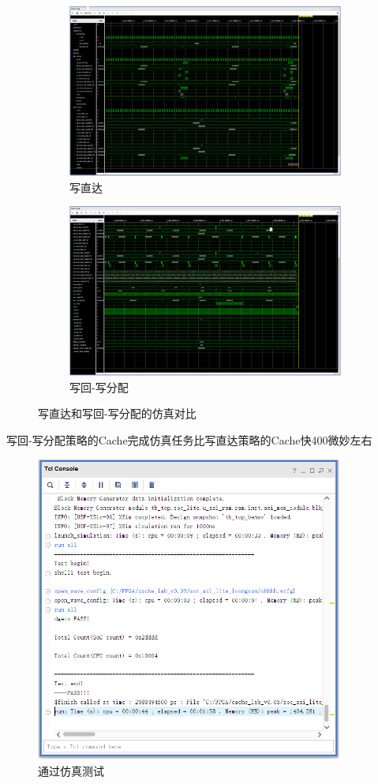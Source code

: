 \begin{figure}[H]
  \centering
  \begin{subfigure}[b]{0.8\textwidth}
    \centering
    \includegraphics[width=\textwidth]{image/wt.png}
    \caption{写直达}
    \label{fig:sub-a}
  \end{subfigure}
  \hfill
  \begin{subfigure}[b]{0.8\textwidth}
    \centering
    \includegraphics[width=\textwidth]{image/wb.png}
    \caption{写回-写分配}
    \label{fig:sub-b}
  \end{subfigure}
  \caption{写直达和写回-写分配的仿真对比}
  \label{fig:sim_compare}
\end{figure}
写回-写分配策略的Cache完成仿真任务比写直达策略的Cache快400微妙左右
\begin{figure}[H]
    \centering
    \includegraphics[width=0.9\textwidth]{image/pass.png}
    \caption{通过仿真测试}
    \label{fig:tcl}
\end{figure}